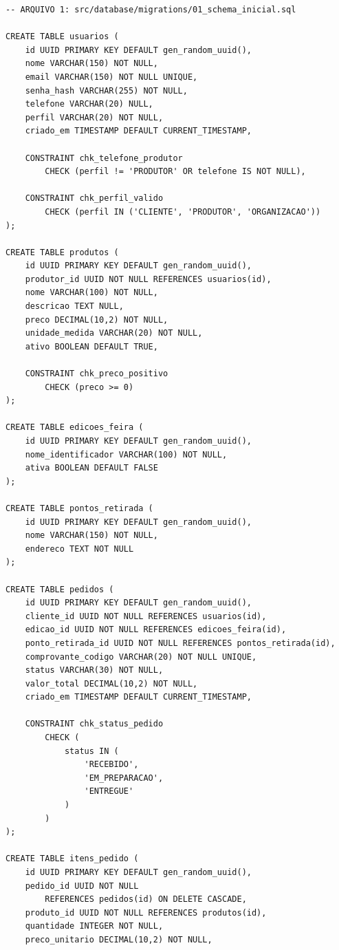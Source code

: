 \documentclass[12pt,a4paper]{article}
\begin{document}
\begin{lstlisting}[caption={Script SQL de criação do banco de dados}, label={lst:script-banco}]
-- ARQUIVO 1: src/database/migrations/01_schema_inicial.sql

CREATE TABLE usuarios (
    id UUID PRIMARY KEY DEFAULT gen_random_uuid(),
    nome VARCHAR(150) NOT NULL,
    email VARCHAR(150) NOT NULL UNIQUE,
    senha_hash VARCHAR(255) NOT NULL,
    telefone VARCHAR(20) NULL,
    perfil VARCHAR(20) NOT NULL,
    criado_em TIMESTAMP DEFAULT CURRENT_TIMESTAMP,

    CONSTRAINT chk_telefone_produtor
        CHECK (perfil != 'PRODUTOR' OR telefone IS NOT NULL),

    CONSTRAINT chk_perfil_valido
        CHECK (perfil IN ('CLIENTE', 'PRODUTOR', 'ORGANIZACAO'))
);

CREATE TABLE produtos (
    id UUID PRIMARY KEY DEFAULT gen_random_uuid(),
    produtor_id UUID NOT NULL REFERENCES usuarios(id),
    nome VARCHAR(100) NOT NULL,
    descricao TEXT NULL,
    preco DECIMAL(10,2) NOT NULL,
    unidade_medida VARCHAR(20) NOT NULL,
    ativo BOOLEAN DEFAULT TRUE,

    CONSTRAINT chk_preco_positivo
        CHECK (preco >= 0)
);

CREATE TABLE edicoes_feira (
    id UUID PRIMARY KEY DEFAULT gen_random_uuid(),
    nome_identificador VARCHAR(100) NOT NULL,
    ativa BOOLEAN DEFAULT FALSE
);

CREATE TABLE pontos_retirada (
    id UUID PRIMARY KEY DEFAULT gen_random_uuid(),
    nome VARCHAR(150) NOT NULL,
    endereco TEXT NOT NULL
);

CREATE TABLE pedidos (
    id UUID PRIMARY KEY DEFAULT gen_random_uuid(),
    cliente_id UUID NOT NULL REFERENCES usuarios(id),
    edicao_id UUID NOT NULL REFERENCES edicoes_feira(id),
    ponto_retirada_id UUID NOT NULL REFERENCES pontos_retirada(id),
    comprovante_codigo VARCHAR(20) NOT NULL UNIQUE,
    status VARCHAR(30) NOT NULL,
    valor_total DECIMAL(10,2) NOT NULL,
    criado_em TIMESTAMP DEFAULT CURRENT_TIMESTAMP,

    CONSTRAINT chk_status_pedido
        CHECK (
            status IN (
                'RECEBIDO',
                'EM_PREPARACAO',
                'ENTREGUE'
            )
        )
);

CREATE TABLE itens_pedido (
    id UUID PRIMARY KEY DEFAULT gen_random_uuid(),
    pedido_id UUID NOT NULL
        REFERENCES pedidos(id) ON DELETE CASCADE,
    produto_id UUID NOT NULL REFERENCES produtos(id),
    quantidade INTEGER NOT NULL,
    preco_unitario DECIMAL(10,2) NOT NULL,


\end{lstlisting}
\end{document}
